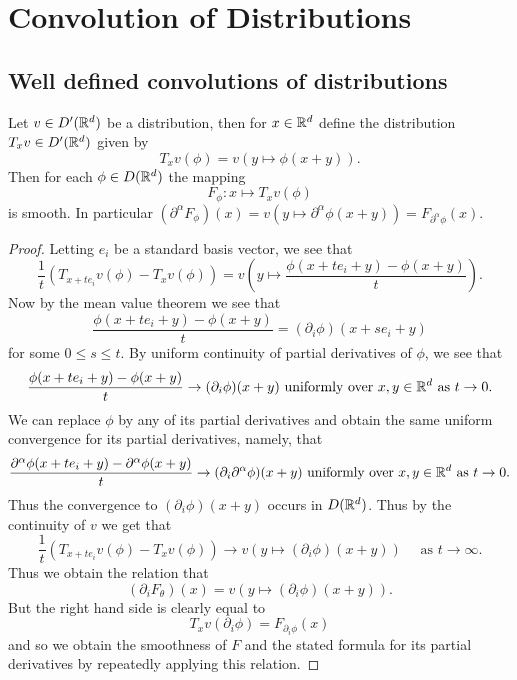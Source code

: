\documentclass[twoside, a4paper, 10pt]{amsart}
\begin{document}
\section{Convolution of Distributions}

\subsection{Well defined convolutions of distributions}

\begin{lemma}\label{lemma: translated distribution} Let $v \in D'(\mathbb{R}^d)$ be a distribution, then for $x \in \mathbb{R}^d$ define the distribution $T_x v \in D'(\mathbb{R}^d)$ given by $$T_x v (\phi) = v(y \mapsto \phi(x+y)).$$ Then for each $\phi \in D(\mathbb{R}^d)$ the mapping $$F_{\phi} : x \mapsto T_x v(\phi)$$ is smooth. In particular $(\partial^{\alpha}F_{\phi})(x) = v(y \mapsto \partial^{\alpha}\phi(x+y)) = F_{\partial^{\alpha} \phi}(x).$

\end{lemma}

\begin{proof} Letting $e_i$ be a standard basis vector, we see that $$\frac{1}{t} (T_{x+t e_i}v (\phi) - T_{x}v(\phi)) = v\left( y \mapsto \frac{\phi(x+te_i + y) - \phi(x+y)}{t} \right).$$ Now by the mean value theorem we see that  $$\frac{\phi(x+te_i + y) - \phi(x+y)}{t} = (\partial_i\phi)(x+ s e_i+y)$$ for some $0 \leq s \leq t$. By uniform continuity of partial derivatives of $\phi$, we see that $$\frac{\phi(x+te_i + y) - \phi(x+y)}{t} \to (\partial_i \phi)(x+y) \text{ uniformly over } x,y \in \mathbb{R}^d \text{ as } t \to 0.$$ We can replace $\phi$ by any of its partial derivatives and obtain the same uniform convergence for its partial derivatives, namely, that $$\frac{\partial^{\alpha}\phi(x+te_i + y) - \partial^{\alpha}\phi(x+y)}{t} \to (\partial_i \partial^{\alpha}\phi)(x+y) \text{ uniformly over } x,y \in \mathbb{R}^d \text{ as } t \to 0.$$  Thus the convergence to $(\partial_i \phi)(x+y)$ occurs in $D(\mathbb{R}^d)$. Thus by the continuity of $v$ we get that $$\frac{1}{t} (T_{x+t e_i}v (\phi) - T_{x}v(\phi)) \to v(y \mapsto (\partial_i \phi)(x+y)) \quad \text{ as } t \to \infty.$$ Thus we obtain the relation that $$(\partial_i F_{\theta})(x) = v(y \mapsto (\partial_i\phi)(x+y)).$$ But the right hand side is clearly equal to $$T_x v(\partial_i\phi) = F_{\partial_i \phi}(x)$$ and so we obtain the smoothness of $F$ and the stated formula for its partial derivatives by repeatedly applying this relation. \end{proof}
\end{document}
